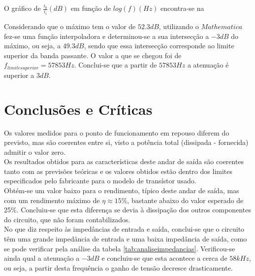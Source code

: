 \documentclass[%
  reprint,
  nofootinbib,
  amsmath,amssymb,
  aps,
  10pt,
  a4paper
]{revtex4-1}
\begin{document}
O gráfico de $\frac{i_0}{i_i} (dB)$ em função de $log(f) (Hz)$ encontra-se na  


Considerando que o máximo tem o valor de $52.3 dB$, utilizando o $Mathematica$ fez-se uma função interpoladora e determinou-se a sua intersecção a $-3 dB$ do máximo, ou seja, a $49.3 dB$, sendo que essa intersecção corresponde ao limite superior da banda passante. O valor a que se chegou foi de $f_{limite superior}=57853Hz$. Conclui-se que a partir de $57853Hz$ a atenuação é superior a $3dB$.



\section{Conclusões e Críticas}
\label{s:conclu}
Os valores medidos para o ponto de funcionamento em repouso diferem do previsto, mas são coerentes entre si, visto a potência total (dissipada - fornecida) admitir o valor zero.\\
Os resultados obtidos para as características deste andar de saída são coerentes tanto com as previsões teóricas  e os valores obtidos estão dentro dos limites especificados pelo fabricante para o modelo de transístor usado.\\
Obtém-se um valor baixo para o rendimento, típico deste andar de saída, mas com um rendimento máximo de $\eta\approx15\%$,  bastante abaixo do valor esperado de 25\%. Concluiu-se que esta diferença se devia à dissipação dos outros componentes do circuito, que não foram contabilizados.\\

No que diz respeito às impedâncias de entrada e saída, conclui-se que o circuito têm uma grande impedância de entrada e uma baixa impedância de saída, como se pode verificar pela análise da tabela \ref{tab:analiseimpedancias}.
Verificou-se ainda qual a atenuação a $-3dB$ e concluiu-se que esta acontece a cerca de $58kHz$, ou seja, a partir desta frequência o ganho de tensão decresce drasticamente.



\nocite{*}
{}
\end{document}
